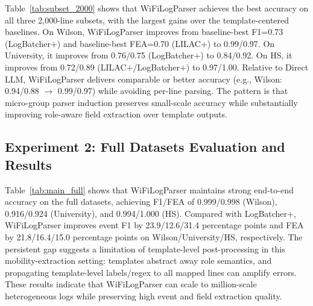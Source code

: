 \documentclass[journal]{IEEEtran}
\begin{document}
Table~\ref{tab:subset_2000} shows that WiFiLogParser achieves the best accuracy on all three 2,000-line subsets, with the largest gains over the template-centered baselines. On Wilson, WiFiLogParser improves from baseline-best F1=0.73 (LogBatcher$+$) and baseline-best FEA=0.70 (LILAC$+$) to 0.99/0.97. On University, it improves from 0.76/0.75 (LogBatcher$+$) to 0.84/0.92. On HS, it improves from 0.72/0.89 (LILAC$+$/LogBatcher$+$) to 0.97/1.00. Relative to Direct LLM, WiFiLogParser delivers comparable or better accuracy (e.g., Wilson: 0.94/0.88 $\rightarrow$ 0.99/0.97) while avoiding per-line parsing. The pattern is that micro-group parser induction preserves small-scale accuracy while substantially improving role-aware field extraction over template outputs.

\subsection{Experiment 2: Full Datasets Evaluation and Results}
\label{subsec:main_perf}

Table~\ref{tab:main_full} shows that WiFiLogParser maintains strong end-to-end accuracy on the full datasets, achieving F1/FEA of 0.999/0.998 (Wilson), 0.916/0.924 (University), and 0.994/1.000 (HS). Compared with LogBatcher$+$, WiFiLogParser improves event F1 by 23.9/12.6/31.4 percentage points and FEA by 21.8/16.4/15.0 percentage points on Wilson/University/HS, respectively. The persistent gap suggests a limitation of template-level post-processing in this mobility-extraction setting: templates abstract away role semantics, and propagating template-level labels/regex to all mapped lines can amplify errors. These results indicate that WiFiLogParser can scale to million-scale heterogeneous logs while preserving high event and field extraction quality.
\end{document}
